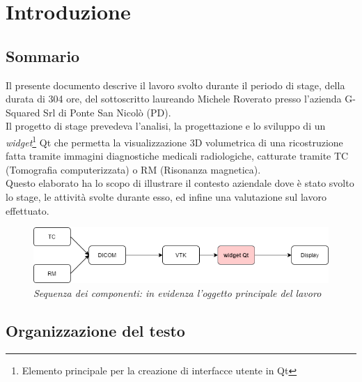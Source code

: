 
\chapter{Introduzione}
\label{cap:introduzione}

\section{Sommario}

Il presente documento descrive il lavoro svolto durante il periodo di stage, della durata di 304 ore, del sottoscritto laureando Michele Roverato presso l'azienda G-Squared Srl di Ponte San Nicolò (PD).
\\
Il progetto di stage prevedeva l'analisi, la progettazione e lo sviluppo di un \emph{widget}\footnote{Elemento principale per la creazione di interfacce utente in Qt} Qt che permetta la visualizzazione 3D volumetrica di una ricostruzione fatta tramite immagini diagnostiche medicali radiologiche, catturate tramite TC (Tomografia computerizzata) o RM (Risonanza magnetica).
\\
Questo elaborato ha lo scopo di illustrare il contesto aziendale dove è stato svolto lo stage, le attività svolte durante esso, ed infine una valutazione sul lavoro effettuato.

\begin{figure}[ht]
    \centering
    \includegraphics[width=1\textwidth]{immagini/schemainiziale.png}
    \caption{\textit{Sequenza dei componenti: in evidenza l'oggetto principale del lavoro}}
\end{figure}

\section{Organizzazione del testo}

